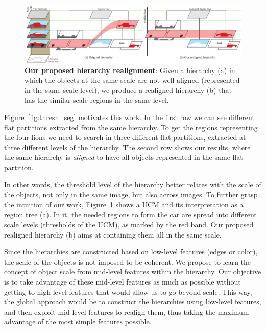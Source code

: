 \begin{figure}
\begin{center}
\includegraphics[width=\textwidth]{scale-aware/fig/hierarchy.pdf}
\end{center}
\caption{\textbf{Our proposed hierarchy realignment}: Given a hierarchy (a) in which the objects at the same scale are not well aligned (represented in the same scale level), we produce a realigned hierarchy (b) that
has the similar-scale regions in the same level.}
\label{fig:hier_align}
\end{figure}

Figure~\ref{fig:thresh_seg} motivates this work.
In the first row we can see different flat partitions extracted from the same hierarchy.
To get the regions representing the four lions we need to search in three different flat partitions, 
extracted at three different levels of the hierarchy.
The second row shows our results, where the same hierarchy is \textit{aligned} to have all objects represented in the same flat partition.

In other words, the threshold level of the hierarchy better relates with the scale of the objects, not only
in the same image, but also across images.
To further grasp the intuition of our work, Figure~\ref{fig:hier_align} shows a UCM and its interpretation as
a region tree (a).
In it, the needed regions to form the car are spread into different scale levels (thresholds of the UCM), as
marked by the red band.
Our proposed realigned hierarchy (b) aims at containing them all in the same scale.

Since the hierarchies are constructed based on low-level features (edges or color), the scale of the objects
is not imposed to be coherent.
We propose to learn the concept of object scale from mid-level features within the hierarchy.
Our objective is to take advantage of these mid-level features as much as possible without getting to
high-level features that would allow us to go beyond scale.
This way, the global approach would be to construct the hierarchies using low-level features,
and then exploit mid-level features to realign them, thus taking the maximum advantage of the most simple 
features possible.

